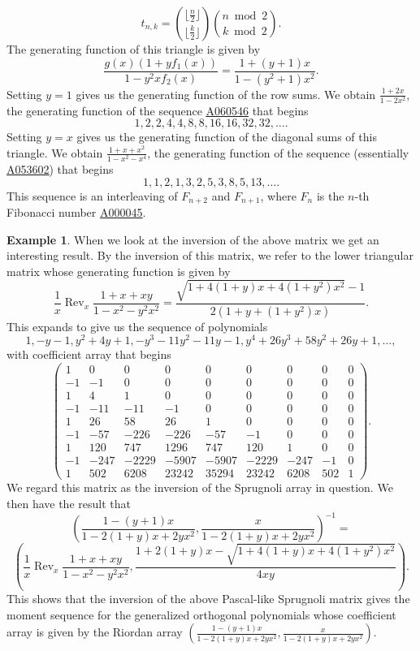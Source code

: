 \documentclass[12pt,reqno]{article}
\theoremstyle{definition}
\newtheorem{example}[theorem]{Example}
\DeclareMathOperator{\Rev}{Rev}
\newcommand{\seqnum}[1]{\href{http://oeis.org/#1}{\underline{#1}}}
\begin{document}
$$t_{n,k}=\binom{\lfloor \frac{n}{2} \rfloor}{\lfloor \frac{k}{2} \rfloor} \binom{n \bmod 2}{k \bmod 2}.$$
The generating function of this triangle is given by
$$\frac{g(x)(1+yf_1(x))}{1-y^2xf_2(x)}=\frac{1+(y+1)x}{1-(y^2+1)x^2}.$$
Setting $y=1$ gives us the generating function of the row sums. We obtain $\frac{1+2x}{1-2x^2}$, the generating function of the sequence  \seqnum{A060546} that begins
$$1, 2, 2, 4, 4, 8, 8, 16, 16, 32, 32,\ldots.$$ Setting $y=x$ gives us the generating function of the diagonal sums of this triangle. We obtain $\frac{1+x+x^2}{1-x^2-x^4}$, the generating function of the sequence (essentially \seqnum{A053602}) that begins
$$1, 1, 2, 1, 3, 2, 5, 3, 8, 5, 13,\ldots.$$  This sequence is an interleaving of $F_{n+2}$ and $F_{n+1}$, where $F_n$ is the $n$-th Fibonacci number \seqnum{A000045}.
\begin{example}
When we look at the inversion of the above matrix we get an interesting result. By the inversion of this matrix, we refer to the lower triangular matrix whose generating function is given by
$$\frac{1}{x} \Rev_x{\frac{1+x+xy}{1-x^2-y^2x^2}}=\frac{\sqrt{1+4(1+y)x+4(1+y^2)x^2}-1}{2(1+y+(1+y^2)x)}.$$
This expands to give us the sequence of polynomials
$$1, -y - 1, y^2 + 4y + 1, - y^3 - 11y^2 - 11y - 1, y^4 + 26y^3 + 58y^2 + 26y + 1,\ldots,$$ with coefficient array that begins
$$\left(\begin{array}{cccccccccc}
1 & 0 & 0 & 0 & 0 & 0 & 0 & 0 & 0 \\
 -1 & -1 & 0 & 0 & 0 & 0 & 0 & 0 & 0 \\
 1 & 4 & 1 & 0 & 0 & 0 & 0 & 0 & 0 \\
 -1 & -11 & -11 & -1 & 0 & 0 & 0 & 0 & 0 \\
 1 & 26 & 58 & 26 & 1 & 0 & 0 & 0 & 0 \\
 -1 & -57 & -226 & -226 & -57 & -1 & 0 & 0 & 0 \\
 1 & 120 & 747 & 1296 & 747 & 120 & 1 & 0 & 0 \\
 -1 & -247 & -2229 & -5907 & -5907 & -2229 & -247 & -1 & 0 \\
 1 & 502 & 6208 & 23242 & 35294 & 23242 & 6208 & 502 & 1
 \end{array}\right).$$ We regard this matrix as the inversion of the Sprugnoli array in question. We then have the result that
 $$\left(\frac{1-(y+1)x}{1-2(1+y)x+2yx^2},\frac{x}{1-2(1+y)x+2yx^2}\right)^{-1}=$$
$$\left(\frac{1}{x} \Rev_x{\frac{1+x+xy}{1-x^2-y^2x^2}}, \frac{1+2(1+y)x-\sqrt{1+4(1+y)x+4(1+y^2)x^2}}{4xy}\right).$$ This shows that the inversion of the above Pascal-like Sprugnoli matrix gives the moment sequence for the generalized orthogonal polynomials whose coefficient array is given by the Riordan array $\left(\frac{1-(y+1)x}{1-2(1+y)x+2yx^2},\frac{x}{1-2(1+y)x+2yx^2}\right)$.
 \end{example}
\end{document}
